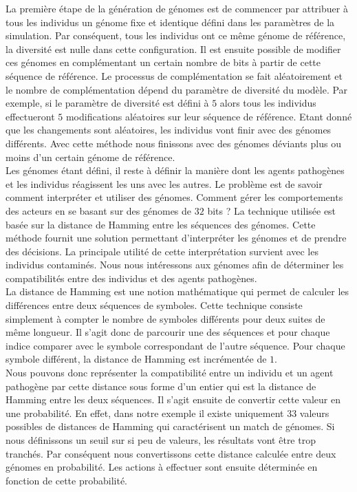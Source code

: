 La première étape de la génération de génomes est de commencer par attribuer à tous les individus un génome fixe et identique défini dans les paramètres de la simulation. Par conséquent, tous les individus ont ce même génome de référence, la diversité est nulle dans cette configuration. Il est ensuite possible de modifier ces génomes en complémentant un certain nombre de bits à partir de cette séquence de référence. Le processus de complémentation se fait aléatoirement et le nombre de complémentation dépend du paramètre de diversité du modèle. Par exemple, si le paramètre de diversité est défini à $5$ alors tous les individus effectueront $5$ modifications aléatoires sur leur séquence de référence. Etant donné que les changements sont aléatoires, les individus vont finir avec des génomes différents. Avec cette méthode nous finissons avec des génomes déviants plus ou moins d'un certain génome de référence.\\

Les génomes étant défini, il reste à définir la manière dont les agents pathogènes et les individus réagissent les uns avec les autres. Le problème est de savoir comment interpréter et utiliser des génomes. Comment gérer les comportements des acteurs en se basant sur des génomes de $32$ bits ? La technique utilisée est basée sur la distance de Hamming entre les séquences des génomes. Cette méthode fournit une solution permettant d'interpréter les génomes et de prendre des décisions. La principale utilité de cette interprétation survient avec les individus contaminés. Nous nous intéressons aux génomes afin de déterminer les compatibilités entre des individus et des agents pathogènes.\\

La distance de Hamming est une notion mathématique qui permet de calculer les différences entre deux séquences de symboles. Cette technique consiste simplement à compter le nombre de symboles différents pour deux suites de même longueur. Il s'agit donc de parcourir une des séquences et pour chaque indice comparer avec le symbole correspondant de l'autre séquence. Pour chaque symbole différent, la distance de Hamming est incrémentée de $1$.\\

Nous pouvons donc représenter la compatibilité entre un individu et un agent pathogène par cette distance sous forme d'un entier qui est la distance de Hamming entre les deux séquences. Il s'agit ensuite de convertir cette valeur en une probabilité. En effet, dans notre exemple il existe uniquement $33$ valeurs possibles de distances de Hamming qui caractérisent un match de génomes. Si nous définissons un seuil sur si peu de valeurs, les résultats vont être trop tranchés. Par conséquent nous convertissons cette distance calculée entre deux génomes en probabilité. Les actions à effectuer sont ensuite déterminée en fonction de cette probabilité.\\

